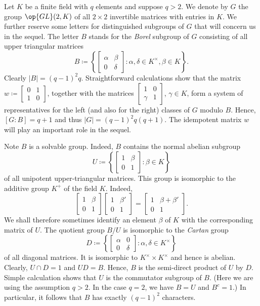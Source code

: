 \documentclass[../main.tex]{subfiles}
\begin{document}
Let $K$ be a finite field with $q$ elements and suppose $q>2$. We denote by $G$ the group $\op{GL}(2,K)$ of all $2\times2$ invertible matrices with entries in $K$. We further reserve some letters for distinguished subgroups of $G$ that will concern us in the sequel. The letter $B$ stands for the \textit{Borel} subgroup of $G$ consisting of all upper triangular matrices
\[B\coloneqq\left\{\begin{bmatrix}
	\alpha & \beta \\
	0 & \delta
\end{bmatrix}:\alpha,\delta\in K^\times,\beta\in K\right\}.\]
Clearly $|B|=(q-1)^2q$. Straightforward calculations show that the matrix $w\coloneqq\begin{bmatrix}
	0 & 1 \\
	1 & 0
\end{bmatrix}$, together with the matrices $\begin{bmatrix}
	1 & 0 \\
	\gamma & 1
\end{bmatrix}$, $\gamma\in K$, form a system of representatives for the left (and also for the right) classes of $G$ modulo $B$. Hence, $[G:B]=q+1$ and thus $|G|=(q-1)^2q(q+1)$. The idempotent matrix $w$ will play an important role in the sequel.

Note $B$ is a solvable group. Indeed, $B$ contains the normal abelian subgroup
\[U\coloneqq\left\{\begin{bmatrix}
	1 & \beta \\
	0 & 1
\end{bmatrix}:\beta\in K\right\}\]
of all unipotent upper-triangular matrices. This group is isomorphic to the additive group $K^+$ of the field $K$. Indeed,
\[\begin{bmatrix}
	1 & \beta \\
	0 & 1
\end{bmatrix}\begin{bmatrix}
	1 & \beta' \\
	0 & 1
\end{bmatrix}=\begin{bmatrix}
	1 & \beta+\beta' \\
	0 & 1
\end{bmatrix}.\]
We shall therefore sometimes identify an element $\beta$ of $K$ with the corresponding matrix of $U$. The quotient group $B/U$ is isomorphic to the \textit{Cartan} group
\[D\coloneqq\left\{\begin{bmatrix}
	\alpha & 0 \\
	0 & \delta
\end{bmatrix}:\alpha,\delta\in K^\times\right\}\]
of all diagonal matrices. It is isomorphic to $K^\times\times K^\times$ and hence is abelian. Clearly, $U\cap D=1$ and $UD=B$. Hence, $B$ is the semi-direct product of $U$ by $D$. Simple calculation shows that $U$ is the commutator subgroup of $B$. (Here we are using the assumption $q>2$. In the case $q=2$, we have $B=U$ and $B^c=1$.) In particular, it follows that $B$ has exactly $(q-1)^2$ characters.
\end{document}
